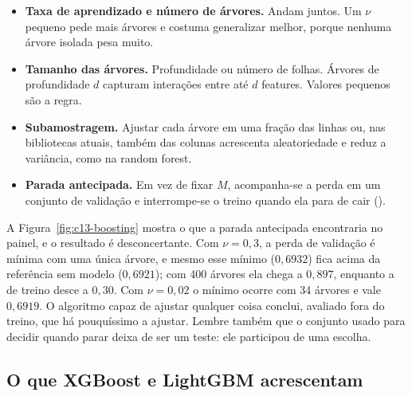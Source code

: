 \begin{itemize}
  \item \textbf{Taxa de aprendizado e número de árvores.} Andam juntos. Um $\nu$ pequeno pede mais árvores e costuma generalizar melhor, porque nenhuma árvore isolada pesa muito.
  \item \textbf{Tamanho das árvores.} Profundidade ou número de folhas. Árvores de profundidade $d$ capturam interações entre até $d$ features. Valores pequenos são a regra.
  \item \textbf{Subamostragem.} Ajustar cada árvore em uma fração das linhas \citep[seção 10.12]{hastie2009} ou, nas bibliotecas atuais, também das colunas acrescenta aleatoriedade e reduz a variância, como na random forest.
  \item \textbf{Parada antecipada.} Em vez de fixar $M$, acompanha-se a perda em um conjunto de validação e interrompe-se o treino quando ela para de cair ().
\end{itemize}


A Figura~\ref{fig:c13-boosting} mostra o que a parada antecipada encontraria no painel, e o resultado é desconcertante. Com $\nu = 0,3$, a perda de validação é mínima com uma única árvore, e mesmo esse mínimo ($0,6932$) fica acima da referência sem modelo ($0,6921$); com 400 árvores ela chega a $0,897$, enquanto a de treino desce a $0,30$. Com $\nu = 0,02$ o mínimo ocorre com 34 árvores e vale $0,6919$. O algoritmo capaz de ajustar qualquer coisa conclui, avaliado fora do treino, que há pouquíssimo a ajustar. Lembre também que o conjunto usado para decidir quando parar deixa de ser um teste: ele participou de uma escolha.

\subsection{O que XGBoost e LightGBM acrescentam}

